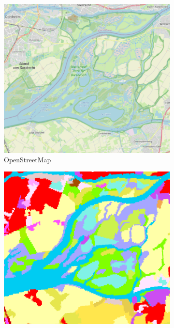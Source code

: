         \begin{figure}[H]
        \centering
    
        \begin{subfigure}[b]{0.48\textwidth}
            \centering
            \includegraphics[width=1\linewidth,height=\linewidth]{figs_01/biesbosch_osm.png}
            \caption{OpenStreetMap}
            \label{fig:biesbosch_osm}
        \end{subfigure}
        \hfill %
        \begin{subfigure}[b]{0.48\textwidth}
            \centering
            \includegraphics[width=1\linewidth,height=\linewidth]{figs_01/biesbosch_clc.png}

\end{subfigure}
\end{figure}
